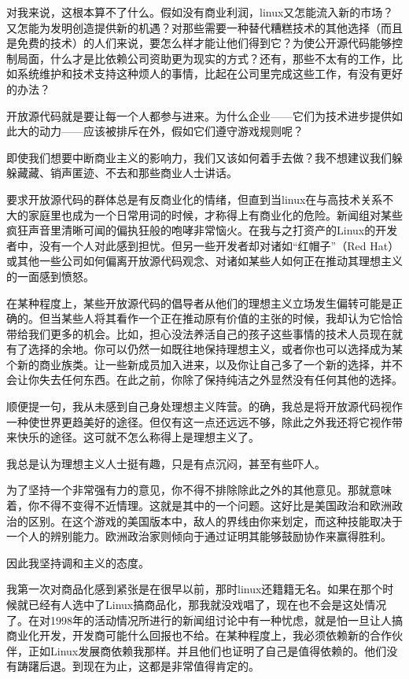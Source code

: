 对我来说，这根本算不了什么。假如没有商业利润，linux又怎能流入新的市场？又怎能为发明创造提供新的机遇？对那些需要一种替代糟糕技术的其他选择（而且是免费的技术）的人们来说，要怎么样才能让他们得到它？为使公开源代码能够控制局面，什么才是比依赖公司资助更为现实的方式？还有，那些不太有的工作，比如系统维护和技术支持这种烦人的事情，比起在公司里完成这些工作，有没有更好的办法？

开放源代码就是要让每一个人都参与进来。为什么企业——它们为技术进步提供如此大的动力——应该被排斥在外，假如它们遵守游戏规则呢？

即使我们想要中断商业主义的影响力，我们又该如何着手去做？我不想建议我们躲躲藏藏、销声匿迹、不去和那些商业人士讲话。

要求开放源代码的群体总是有反商业化的情绪，但直到当linux在与高技术关系不大的家庭里也成为一个日常用词的时候，才称得上有商业化的危险。新闻组对某些疯狂声音里清晰可闻的偏执狂般的咆哮非常恼火。在我与之打资产的Linux的开发者中，没有一个人对此感到担忧。但另一些开发者却对诸如“红帽子”（Red Hat）或其他一些公司如何偏离开放源代码观念、对诸如某些人如何正在推动其理想主义的一面感到愤怒。

在某种程度上，某些开放源代码的倡导者从他们的理想主义立场发生偏转可能是正确的。但当某些人将其看作一个正在推动原有价值的主张的时候，我却认为它恰恰带给我们更多的机会。比如，担心没法养活自己的孩子这些事情的技术人员现在就有了选择的余地。你可以仍然一如既往地保持理想主义，或者你也可以选择成为某个新的商业族类。让一些新成员加入进来，以及你让自己多了一个新的选择，并不会让你失去任何东西。在此之前，你除了保持纯洁之外显然没有任何其他的选择。

顺便提一句，我从未感到自己身处理想主义阵营。的确，我总是将开放源代码视作一种使世界更趋美好的途径。但仅有这一点还远远不够，除此之外我还将它视作带来快乐的途径。这可就不怎么称得上是理想主义了。

我总是认为理想主义人士挺有趣，只是有点沉闷，甚至有些吓人。

为了坚持一个非常强有力的意见，你不得不排除除此之外的其他意见。那就意味着，你不得不变得不近情理。这就是其中的一个问题。这好比是美国政治和欧洲政治的区别。在这个游戏的美国版本中，敌人的界线由你来划定，而这种技能取决于一个人的辨别能力。欧洲政治家则倾向于通过证明其能够鼓励协作来赢得胜利。

因此我坚持调和主义的态度。

我第一次对商品化感到紧张是在很早以前，那时linux还籍籍无名。如果在那个时候就已经有人选中了Linux搞商品化，那我就没戏唱了，现在也不会是这处情况了。在对1998年的活动情况所进行的新闻组讨论中有一种忧虑，就是怕一旦让人搞商业化开发，开发商可能什么回报也不给。在某种程度上，我必须依赖新的合作伙伴，正如Linux发展商依赖我那样。并且他们也证明了自己是值得依赖的。他们没有踌躇后退。到现在为止，这都是非常值得肯定的。

